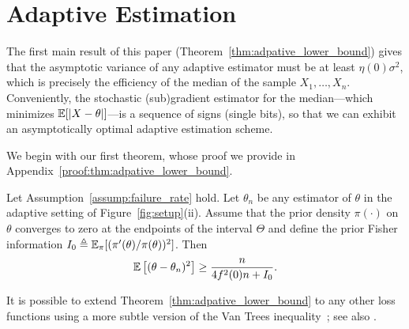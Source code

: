 \section{Adaptive Estimation \label{sec:sequential}}

The first main result of this paper (Theorem~\ref{thm:adpative_lower_bound})
gives that the asymptotic variance of any adaptive estimator must be at
least $\eta(0)\sigma^2$, which is precisely the efficiency of the median of
the sample $X_1,\ldots,X_n$. Conveniently, the stochastic (sub)gradient
estimator for the median---which minimizes $\mathbb{E}[|X - \theta|]$---is a
sequence of signs (single bits), so that we can exhibit an asymptotically
optimal adaptive estimation scheme.


We begin with our first theorem, whose proof we provide in
Appendix~\ref{proof:thm:adpative_lower_bound}.
\begin{thm}\label{thm:adpative_lower_bound}
  Let Assumption~\ref{assump:failure_rate} hold.
  Let ${\theta}_n$ be any estimator of $\theta$ in the adaptive setting of
  Figure~\ref{fig:setup}(ii). Assume that the prior
  density $\pi(\cdot)$ on $\theta$ converges to zero
  at the endpoints of the interval $\Theta$ and
  define the prior Fisher information
  $I_0 \triangleq \mathbb{E}_\pi[(\pi'(\theta) / \pi(\theta))^2]$.
  Then
  \begin{equation*}
    \mathbb{E}\left[ (\theta-{\theta}_n)^2 \right] \geq   \frac{n}{ 4f^2(0) n + I_0}.
  \end{equation*}
\end{thm}


It is possible to extend Theorem~\ref{thm:adpative_lower_bound} to any other
loss functions using a more subtle version of the Van Trees
inequality~\cite{efroimovich1980information}; see also
\cite{DBLP:journals/corr/abs-1902-08582}.

